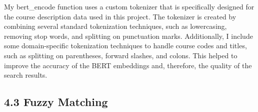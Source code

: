 \documentclass[
	a4paper, %
	10pt, %
	unnumberedsections, %
	twoside, %
]{LTJournalArticle}
\begin{document}
My bert\_encode function uses a custom tokenizer that is specifically designed for the course description data used in this project. The tokenizer is created by combining several standard tokenization techniques, such as lowercasing, removing stop words, and splitting on punctuation marks. Additionally, I include some domain-specific tokenization techniques to handle course codes and titles, such as splitting on parentheses, forward slashes, and colons. This helped to improve the accuracy of the BERT embeddings and, therefore, the quality of the search results.


\subsection{4.3 Fuzzy Matching}






\end{document}
